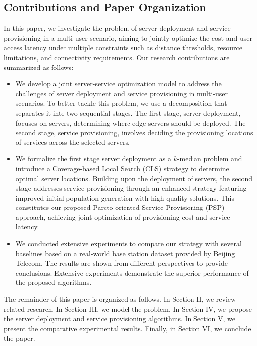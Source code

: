 \documentclass[10pt, conference, letterpaper]{IEEEtran}
\begin{document}
\subsection{Contributions and Paper Organization}
In this paper, we investigate the problem of server deployment and service provisioning in a multi-user scenario, aiming to jointly optimize the cost and user access latency under multiple constraints such as distance thresholds, resource limitations, and connectivity requirements. Our research contributions are summarized as follows:
\begin{itemize}
  \item We develop a joint server-service optimization model to address the challenges of server deployment and service provisioning in multi-user scenarios. To better tackle this problem, we use a decomposition that separates it into two sequential stages. The first stage, server deployment, focuses on servers, determining where edge servers should be deployed. The second stage, service provisioning, involves deciding the provisioning locations of services across the selected servers. 
  \item We formalize the first stage server deployment as a $k$-median problem and introduce a Coverage-based Local Search (CLS) strategy to determine optimal server locations. Building upon the deployment of servers, the second stage addresses service provisioning through an enhanced strategy featuring improved initial population generation with high-quality solutions. This constitutes our proposed Pareto-oriented Service Provisioning (PSP) approach, achieving joint optimization of provisioning cost and service latency.
  \item We conducted extensive experiments to compare our strategy with several baselines based on a real-world base station dataset provided by Beijing Telecom. The results are shown from different perspectives to provide conclusions. Extensive experiments demonstrate the superior performance of the proposed algorithms.
\end{itemize}

The remainder of this paper is organized as follows. In Section II, we review related research. In Section III, we model the problem. In Section IV, we propose the server deployment and service provisioning algorithms. In Section V, we present the comparative experimental results. Finally, in Section VI, we conclude the paper.
\end{document}
